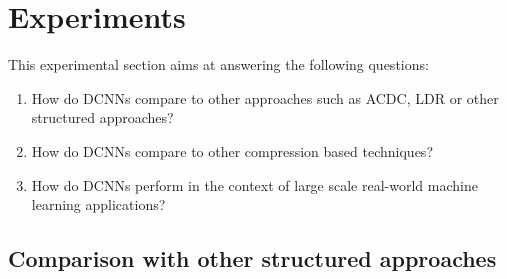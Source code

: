 


\section{Experiments}
\label{section:ch4-experiments}

This experimental section aims at answering the following questions:
\begin{enumerate}
    \itshape
    \item How do DCNNs compare to other approaches such as ACDC, LDR or other structured approaches?
    \item How do DCNNs compare to other compression based techniques?
    \item How do DCNNs perform in the context of large scale real-world machine learning applications?  
\end{enumerate}


\subsection{Comparison with other structured approaches}
\label{subsection:ch4-comparison_with_other_structured_approches}


